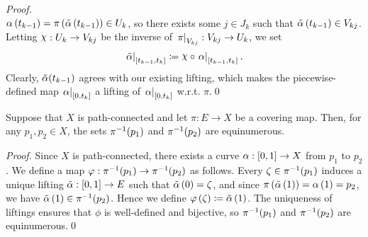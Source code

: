 \documentclass[../Moduli_Spaces_of_Riemann_Surfaces.tex]{subfiles}
\begin{document}
\begin{proof}
{\begin{equation*}
            \end{equation*}
        } $\alpha\left(t_{k-1}\right)=\pi\left(\tilde{\alpha}\left(t_{k-1}\right)\right)\in U_k$, so there exists some $j\in J_k$ such that $\tilde{\alpha}\left(t_{k-1}\right)\in V_{kj}$. Letting $\cchi:U_k\to V_{kj}$ be the inverse of $\left.\pi\right|_{V_{kj}}:V_{kj}\to U_k$, we set
        \begin{equation*}
            \l.\tilde{\alpha}\r|_{\l[t_{k-1},t_k\r]}\coloneqq\cchi\circ\l.\alpha\r|_{\l[t_{k-1},t_k\r]}.
        \end{equation*}
        Clearly, $\tilde{\alpha}\!\left(t_{k-1}\right)$ agrees with our existing lifting, which makes the piecewise-defined map $\left.\alpha\right|_{\left[0,t_k\right]}$ a lifting of $\left.\alpha\right|_{\left[0,t_k\right]}$ w.r.t. $\pi$.\qed
    \end{proof}
    \begin{corollary}\label{2.1:cor:fiber_cardinalities_coincide}
        Suppose that $X$ is path-connected and let $\pi:E\to X$ be a covering map. Then, for any $p_1,p_2\in X$, the sets $\pi^{-1}\!\left(p_1\right)$ and $\pi^{-1}\!\left(p_2\right)$ are equinumerous.
    \end{corollary}
    \begin{proof}
        Since $X$ is path-connected, there exists a curve $\alpha:\left[0,1\right]\to X$ from $p_1$ to $p_2$. We define a map $\varphi:\pi^{-1}\!\left(p_1\right)\to\pi^{-1}\!\left(p_2\right)$ as follows. Every $\zeta\in\pi^{-1}\!\left(p_1\right)$ induces a unique lifting $\tilde{\alpha}:\left[0,1\right]\to E$ such that $\tilde{\alpha}\left(0\right)=\zeta$, and since $\pi\left(\tilde{\alpha}\left(1\right)\right)=\alpha\left(1\right)=p_2$, we have $\tilde{\alpha}\left(1\right)\in\pi^{-1}\!\left(p_2\right)$. Hence we define $\varphi\left(\zeta\right)\coloneqq\tilde{\alpha}\left(1\right)$. The uniqueness of liftings ensures that $\phi$ is well-defined and bijective, so $\pi^{-1}\!\left(p_1\right)$ and $\pi^{-1}\!\left(p_2\right)$ are equinumerous.\qed
    \end{proof}
\end{document}
